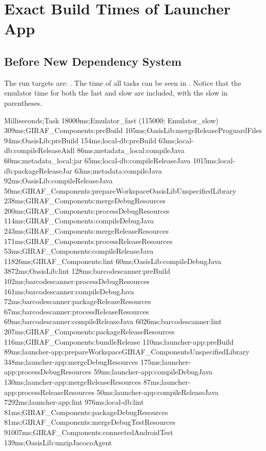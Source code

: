 \chapter{Exact Build Times of Launcher App}
\label{app:build_times}

\section{Before New Dependency System}
The run targets are: . The time of all tasks can be seen in . Notice that the emulator time for both the fast and slow are included, with the slow in parentheses.

\begin{gradlecode}[caption=Running time of tasks of old dependency system,label=lst:full_data_old_dep_system]
Milliseconds;Task
18000ms;Emulator_fast
(115000; Emulator_slow)
309ms;GIRAF_Components:preBuild
105ms;OasisLib:mergeReleaseProguardFiles
94ms;OasisLib:preBuild
154ms;local-db:preBuild
63ms;local-db:compileReleaseAidl
86ms;metadata_local:compileJava
60ms;metadata_local:jar
65ms;local-db:compileReleaseJava
1015ms;local-db:packageReleaseJar
63ms;metadata:compileJava
92ms;OasisLib:compileReleaseJava
50ms;GIRAF_Components:prepareWorkspaceOasisLibUnspecifiedLibrary
238ms;GIRAF_Components:mergeDebugResources
200ms;GIRAF_Components:processDebugResources
114ms;GIRAF_Components:compileDebugJava
243ms;GIRAF_Components:mergeReleaseResources
171ms;GIRAF_Components:processReleaseResources
53ms;GIRAF_Components:compileReleaseJava
11826ms;GIRAF_Components:lint
60ms;OasisLib:compileDebugJava
3872ms;OasisLib:lint
128ms;barcodescanner:preBuild
102ms;barcodescanner:processDebugResources
161ms;barcodescanner:compileDebugJava
72ms;barcodescanner:packageReleaseResources
67ms;barcodescanner:processReleaseResources
69ms;barcodescanner:compileReleaseJava
6026ms;barcodescanner:lint
207ms;GIRAF_Components:packageReleaseResources
116ms;GIRAF_Components:bundleRelease
110ms;launcher-app:preBuild
89ms;launcher-app:prepareWorkspaceGIRAF_ComponentsUnspecifiedLibrary
348ms;launcher-app:mergeDebugResources
175ms;launcher-app:processDebugResources
59ms;launcher-app:compileDebugJava
130ms;launcher-app:mergeReleaseResources
87ms;launcher-app:processReleaseResources
50ms;launcher-app:compileReleaseJava
7292ms;launcher-app:lint
976ms;local-db:lint
81ms;GIRAF_Components:packageDebugResources
81ms;GIRAF_Components:mergeDebugTestResources
91007ms;GIRAF_Components:connectedAndroidTest
139ms;OasisLib:unzipJacocoAgent

\end{gradlecode}
